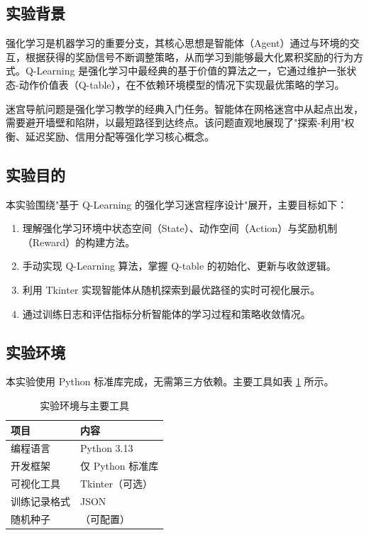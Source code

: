\documentclass[UTF8,12pt,a4paper]{ctexart}
\begin{document}
\subsection{实验背景}
强化学习是机器学习的重要分支，其核心思想是智能体（Agent）通过与环境的交互，根据获得的奖励信号不断调整策略，从而学习到能够最大化累积奖励的行为方式。Q-Learning 是强化学习中最经典的基于价值的算法之一，它通过维护一张状态-动作价值表（Q-table），在不依赖环境模型的情况下实现最优策略的学习。

迷宫导航问题是强化学习教学的经典入门任务。智能体在网格迷宫中从起点出发，需要避开墙壁和陷阱，以最短路径到达终点。该问题直观地展现了"探索-利用"权衡、延迟奖励、信用分配等强化学习核心概念。

\subsection{实验目的}
本实验围绕"基于 Q-Learning 的强化学习迷宫程序设计"展开，主要目标如下：
\begin{enumerate}
    \item 理解强化学习环境中状态空间（State）、动作空间（Action）与奖励机制（Reward）的构建方法。
    \item 手动实现 Q-Learning 算法，掌握 Q-table 的初始化、更新与收敛逻辑。
    \item 利用 Tkinter 实现智能体从随机探索到最优路径的实时可视化展示。
    \item 通过训练日志和评估指标分析智能体的学习过程和策略收敛情况。
\end{enumerate}

\subsection{实验环境}
本实验使用 Python 标准库完成，无需第三方依赖。主要工具如表 \ref{tab:env} 所示。

\begin{table}[H]
\centering
\caption{实验环境与主要工具}
\label{tab:env}
\begin{tabular}{>{\centering\arraybackslash}p{3.5cm}>{\centering\arraybackslash}p{8.5cm}}
\toprule
项目 & 内容 \\
\midrule
编程语言 & Python 3.13 \\
开发框架 & 仅 Python 标准库 \\
可视化工具 & Tkinter（可选） \\
训练记录格式 & JSON \\
随机种子 & 42（可配置） \\
\bottomrule
\end{tabular}
\end{table}
\end{document}
